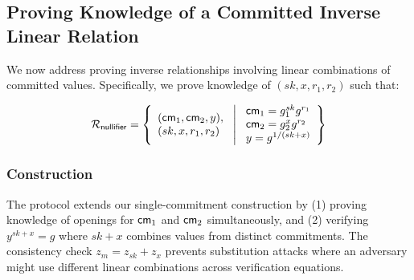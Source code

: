 \subsection{Proving Knowledge of a Committed Inverse Linear Relation}\label{sec-pok-committed-inv-linear-relation}

We now address proving inverse relationships involving linear combinations of committed values. Specifically, we prove knowledge of $(sk, x, r_1, r_2)$ such that:

\[
\mathcal{R}_{\mathsf{nullifier}} = \left\{ 
\begin{array}{l} (\mathsf{cm}_1, \mathsf{cm}_2, y),\\
(sk, x, r_1, r_2) 
\end{array}
\ \middle|
\ \begin{array}{l}
\mathsf{cm}_1 = g_1^{sk} g^{r_1} \\
\mathsf{cm}_2 = g_2^{x} g^{r_2} \\
y = g^{1/(sk + x)} \\
\end{array} \right\}
\]







\subsubsection{Construction}
The protocol extends our single-commitment construction by (1) proving knowledge of openings for $\mathsf{cm}_1$ and $\mathsf{cm}_2$ simultaneously, and (2) verifying $y^{sk+x} = g$ where $sk+x$ combines values from distinct commitments. The consistency check $z_m = z_{sk} + z_x$ prevents substitution attacks where an adversary might use different linear combinations across verification equations.

